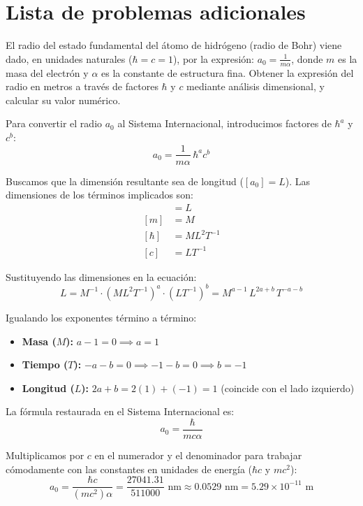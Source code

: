 \section{Lista de problemas adicionales}
\setcounter{problemacontador}{0}
\begin{problema}
El radio del estado fundamental del átomo de hidrógeno (radio de Bohr) viene dado, en unidades naturales ($\hbar = c = 1$), por la expresión: $a_0 = \frac{1}{m \alpha}$, donde $m$ es la masa del electrón y $\alpha$ es la constante de estructura fina. Obtener la expresión del radio en metros a través de factores $\hbar$ y $c$ mediante análisis dimensional, y calcular su valor numérico.

\tcblower

Para convertir el radio $a_0$ al Sistema Internacional, introducimos factores de $\hbar^a$ y $c^b$:
\[
a_0 = \frac{1}{m \alpha} \, \hbar^a c^b
\]

Buscamos que la dimensión resultante sea de longitud ($[a_0] = L$). Las dimensiones de los términos implicados son:
\begin{align*}
[a_0] &= L \\
[m] &= M \\
[\hbar] &= M L^2 T^{-1} \\
[c] &= L T^{-1}
\end{align*}

Sustituyendo las dimensiones en la ecuación:
\[
L = M^{-1} \cdot (M L^2 T^{-1})^a \cdot (L T^{-1})^b = M^{a-1} \, L^{2a+b} \, T^{-a-b}
\]

Igualando los exponentes término a término:
\begin{itemize}
    \item \textbf{Masa ($M$):} $a - 1 = 0 \implies a = 1$
    \item \textbf{Tiempo ($T$):} $-a - b = 0 \implies -1 - b = 0 \implies b = -1$
    \item \textbf{Longitud ($L$):} $2a + b = 2(1) + (-1) = 1$ \quad (coincide con el lado izquierdo)
\end{itemize}

La fórmula restaurada en el Sistema Internacional es:
\[
a_0 = \frac{\hbar}{m c \alpha}
\]

Multiplicamos por $c$ en el numerador y el denominador para trabajar cómodamente con las constantes en unidades de energía ($\hbar c$ y $m c^2$):
\[
a_0 = \frac{\hbar c}{(m c^2) \alpha} = \frac{27041.31}{511000} \text{ nm} \approx 0.0529 \text{ nm} = 5.29 \times 10^{-11} \text{ m}
\]
\end{problema}
